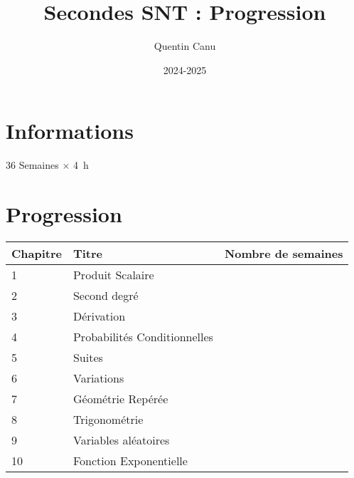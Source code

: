 \documentclass{article}
\title{Secondes SNT : Progression}
\author{Quentin Canu}
\date{2024-2025}
\begin{document}
\maketitle

\section{Informations}

36 Semaines $\times$ \qty{4}{\hour}

\section{Progression}

\begin{center}
    
\begin{tabular}{|l|p{4cm}|p{2cm}|}
\hline
Chapitre
    & 
Titre
        & 
Nombre de semaines\\
\hline
1   &
Produit Scalaire
        &
\\
\hline
2   &
Second degré
        &
\\
\hline
3   &
Dérivation
        &
\\
\hline
4   &
Probabilités Conditionnelles
        &
\\
\hline
5   &
Suites
        &
\\
\hline
6   &
Variations
        &
\\
\hline
7   &
Géométrie Repérée
        &
\\
\hline
8   &
Trigonométrie
        &
\\
\hline
9   &
Variables aléatoires
        &
\\
\hline
10  &
Fonction Exponentielle
        &
\\
\hline
\end{tabular}
\end{center}
\end{document}
